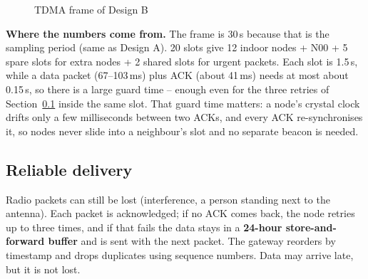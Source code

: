 \documentclass[11pt,a4paper]{report}
\newcommand{\why}[1]{\par\noindent\colorbox{gray!10}{\parbox{\dimexpr\linewidth-2\fboxsep}{\small\textbf{Where the numbers come from.} #1}}\par}
\begin{document}
\begin{figure}[htbp]
\centering
{}
\caption{TDMA frame of Design B}\label{fig:tdma}
\end{figure}

\why{The frame is 30\,s because that is the sampling period (same as Design A). 20 slots give 12 indoor nodes + N00 + 5 spare slots for extra nodes + 2 shared slots for urgent packets. Each slot is 1.5\,s, while a data packet (67--103\,ms) plus ACK (about 41\,ms) needs at most about 0.15\,s, so there is a large guard time -- enough even for the three retries of Section~\ref{sec:reliable} inside the same slot. That guard time matters: a node's crystal clock drifts only a few milliseconds between two ACKs, and every ACK re-synchronises it, so nodes never slide into a neighbour's slot and no separate beacon is needed.}

\subsection{Reliable delivery}\label{sec:reliable}
Radio packets can still be lost (interference, a person standing next to the antenna). Each packet is acknowledged; if no ACK comes back, the node retries up to three times, and if that fails the data stays in a \textbf{24-hour store-and-forward buffer} and is sent with the next packet. The gateway reorders by timestamp and drops duplicates using sequence numbers. Data may arrive late, but it is not lost.
\end{document}
